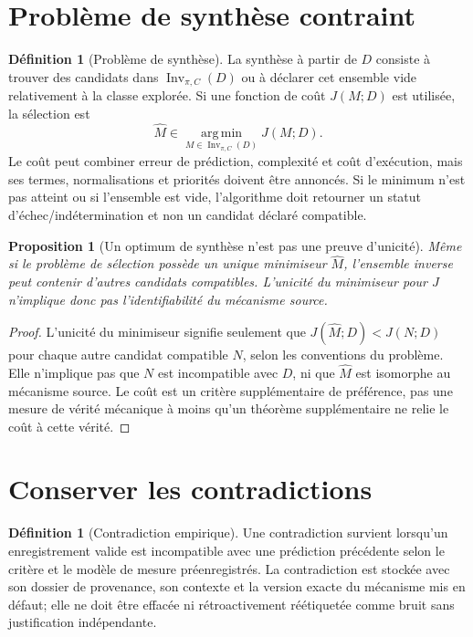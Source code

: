 \documentclass[11pt,oneside]{book}
\newtheorem{proposition}[theoreme]{Proposition}
\theoremstyle{definition}
\newtheorem{definition}[theoreme]{Définition}
\theoremstyle{remark}
\newcommand{\1}{\mathbf 1}
\newcommand{\argmin}{\operatorname*{arg\,min}}
\newcommand{\Inv}{\operatorname{Inv}}
\begin{document}
\section{Problème de synthèse contraint}
\begin{definition}[Problème de synthèse]
La synthèse à partir de $D$ consiste à trouver des candidats dans $\Inv_{\pi,C}(D)$ ou à déclarer cet ensemble vide relativement à la classe explorée. Si une fonction de coût $J(M;D)$ est utilisée, la sélection est
\[
\widehat M\in\argmin_{M\in\Inv_{\pi,C}(D)}J(M;D).
\]
Le coût peut combiner erreur de prédiction, complexité et coût d'exécution, mais ses termes, normalisations et priorités doivent être annoncés. Si le minimum n'est pas atteint ou si l'ensemble est vide, l'algorithme doit retourner un statut d'échec/indétermination et non un candidat déclaré compatible.
\end{definition}

\begin{proposition}[Un optimum de synthèse n'est pas une preuve d'unicité]
Même si le problème de sélection possède un unique minimiseur $\widehat M$, l'ensemble inverse peut contenir d'autres candidats compatibles. L'unicité du minimiseur pour $J$ n'implique donc pas l'identifiabilité du mécanisme source.
\end{proposition}
\begin{proof}
L'unicité du minimiseur signifie seulement que $J(\widehat M;D)<J(N;D)$ pour chaque autre candidat compatible $N$, selon les conventions du problème. Elle n'implique pas que $N$ est incompatible avec $D$, ni que $\widehat M$ est isomorphe au mécanisme source. Le coût est un critère supplémentaire de préférence, pas une mesure de vérité mécanique à moins qu'un théorème supplémentaire ne relie le coût à cette vérité.\end{proof}

\section{Conserver les contradictions}
\begin{definition}[Contradiction empirique]
Une contradiction survient lorsqu'un enregistrement valide est incompatible avec une prédiction précédente selon le critère et le modèle de mesure préenregistrés. La contradiction est stockée avec son dossier de provenance, son contexte et la version exacte du mécanisme mis en défaut; elle ne doit être effacée ni rétroactivement réétiquetée comme bruit sans justification indépendante.
\end{definition}
\end{document}
